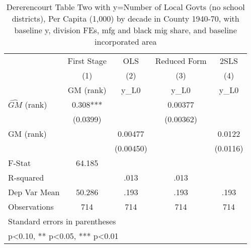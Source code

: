 \begin{table}[htbp]\centering
\def\sym#1{\ifmmode^{#1}\else\(^{#1}\)\fi}
\caption{Dererencourt Table Two with y=Number of Local Govts (no school districts), Per Capita (1,000) by decade in County 1940-70, with baseline y, division FEs, mfg and black mig share, and baseline incorporated area}
\begin{tabular}{l*{4}{c}}
\toprule
                    & First Stage   &         OLS   &Reduced Form   &        2SLS   \\
                    &\multicolumn{1}{c}{(1)}&\multicolumn{1}{c}{(2)}&\multicolumn{1}{c}{(3)}&\multicolumn{1}{c}{(4)}\\
                    &\multicolumn{1}{c}{GM  (rank)}&\multicolumn{1}{c}{y\_L0}&\multicolumn{1}{c}{y\_L0}&\multicolumn{1}{c}{y\_L0}\\
\midrule
$\hat{GM}$ (rank)   &       0.308***&               &     0.00377   &               \\
                    &    (0.0399)   &               &   (0.00362)   &               \\
\addlinespace
GM  (rank)          &               &     0.00477   &               &      0.0122   \\
                    &               &   (0.00450)   &               &    (0.0116)   \\
\midrule
F-Stat              &      64.185   &               &               &               \\
R-squared           &               &        .013   &        .013   &               \\
Dep Var Mean        &      50.286   &        .193   &        .193   &        .193   \\
Observations        &         714   &         714   &         714   &         714   \\
\bottomrule
\multicolumn{5}{l}{\footnotesize Standard errors in parentheses}\\
\multicolumn{5}{l}{\footnotesize * p<0.10, ** p<0.05, *** p<0.01}\\
\end{tabular}
\end{table}
